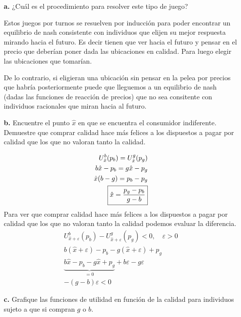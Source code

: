 \documentclass{exam}
\begin{document}
\begin{itemize}
    \item[\textbf{a.}] ¿Cuál es el procedimiento para resolver este tipo de juego?
    \begin{solution}
        Estos juegos por turnos se resuelven por inducción para poder encontrar un equilibrio de nash consistente con individuos que elijen su mejor respuesta mirando hacia el futuro. Es decir tienen que ver hacia el futuro y pensar en el precio que deberían poner dada las ubicaciones en calidad. Para luego elegir las ubicaciones que tomarían. 

        De lo contrario, si eligieran una ubicación sin pensar en la pelea por precios que habría posteriormente puede que lleguemos a un equilibrio de nash (dadas las funciones de reacción de precios) que no sea consitente con individuos racionales que miran hacia al futuro. 
    \end{solution}
    \item[\textbf{b.}] Encuentre el punto $\hat{x}$ en que se encuentra el consumidor indiferente. Demuestre que comprar calidad hace más felices a los dispuestos a pagar por calidad que los que no valoran tanto la calidad.
    \begin{solution}
        \begin{align}
            U_{\hat{x}}^b(p_b) = U_{\hat{x}}^g(p_g) \notag \\
            b\hat{x} - p_b =  g\hat{x} - p_g \notag \\
            \hat{x} (b-g) = p_b-p_g \notag \\
            \boxed{\hat{x} = \frac{p_g-p_b}{g-b}} \label{ind indife}
        \end{align}
        Para ver que comprar calidad hace más felices a los dispuestos a pagar por calidad que los que no valoran tanto la calidad podemos evaluar la diferencia. 
        \begin{align*}
            U_{\hat{x} + \varepsilon}^{b}(p_b) - U_{\hat{x} + \varepsilon}^{g}(p_g) < 0 , \quad \varepsilon > 0 \\
            b(\hat{x} + \varepsilon) - p_b - g(\hat{x} + \varepsilon) + p_g \\
            \underbrace{b\hat{x} - p_b -  g\hat{x} + p_g }_{= 0} + b\varepsilon - g\varepsilon \\
            \boxed{-(g-b)\varepsilon < 0 }
        \end{align*}
    \end{solution}
    \item[\textbf{c.}] Grafique las funciones de utilidad en función de la calidad para individuos sujeto a que si compran $g$ o $b$. 
    \begin{solution}
        \begin{tikzpicture}


\end{tikzpicture}
\end{solution}
\end{itemize}
\end{document}
